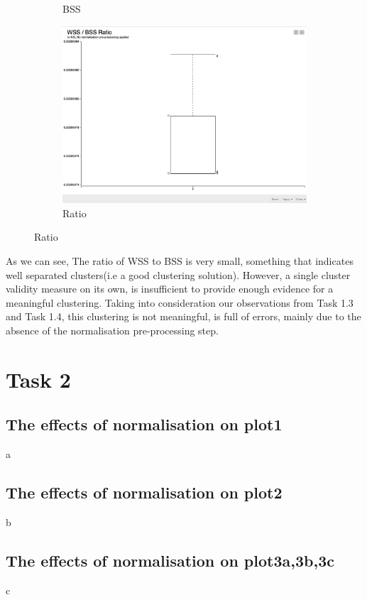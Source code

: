 \begin{figure}[H]
\begin{subfigure}{0.4\textwidth}
		\caption{BSS}
		\label{fig:second}
	\end{subfigure}
	\hfill
	\begin{subfigure}{0.4\textwidth}
		\includegraphics[width=\textwidth]{res/task-1/WSS-BSS-Ratio}
		\caption{Ratio}
		\label{fig:third}
	\end{subfigure}
	\label{fig:figures}	
\end{figure}
\fi
As we can see, The ratio of WSS to BSS is very small, something that indicates well separated clusters(i.e a good clustering solution). However, a single cluster validity measure on its own, is insufficient to provide enough evidence for a meaningful clustering. Taking into consideration our observations from Task 1.3 and Task 1.4, this clustering \cite{???}is not meaningful, is full of
errors, mainly due to the absence of the normalisation pre-processing step.
\section{Task 2}
\subsection{The effects of normalisation on plot1}
a
\subsection{The effects of normalisation on plot2}
b
\subsection{The effects of normalisation on plot3a,3b,3c}
c	
